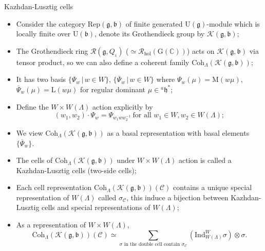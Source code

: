 \documentclass[fleqn,xcolor=dvipsnames]{beamer}
\newcommand{\BC}{{\mathbb {C}}}
\newcommand{\CC}{{\mathcal {C}}}
\newcommand{\CK}{{\mathcal {K}}}
\newcommand{\CR}{{\mathcal {R}}}
\newcommand{\RG}{{\mathrm {G}}}
\newcommand{\RL}{{\mathrm {L}}}
\newcommand{\RM}{{\mathrm {M}}}
\newcommand{\fb}{\mathfrak{b}}
\newcommand{\fg}{\mathfrak{g}}
\newcommand{\fh}{\mathfrak{h}}
\newcommand{\U}{{\mathrm{U}}}
\newcommand{\Ind}{{\mathrm{Ind}}}
\newcommand{\Rep}{{\mathrm{Rep}}}
\newcommand{\set}[2]{\{#1\,|\,#2\}}
\renewcommand{\bar}{\overline}
\begin{document}
\begin{frame}{Kazhdan-Lusztig cells}
  \begin{itemize}
    \item Consider the category $\Rep(\fg,\fb)$ of finite generated $\U(\fg)$-module which is locally finite over $\U(\fb)$, denote its Grothendieck group by $\CK(\fg,\fb)$;
    \item The Grothendieck ring $\CR(\fg,Q_{\iota})$ ($\simeq \CR_{\mathrm{hol}}(\RG(\BC))$) acts on $\CK(\fg,\fb)$ via tensor product, so we can also define a coherent family $\mathrm{Coh}_{\Lambda}(\CK(\fg,\fb))$;
    \item It has two basis $\set{\Psi_w}{w \in W}$, $\set{\bar{\Psi}_{w}}{w \in W}$ where $\Psi_w(\mu) = \RM(w\mu)$, $\bar{\Psi}_{w}(\mu) = \RL(w\mu)$ for regular dominant $\mu \in {^{a}\fh}^*$;
    \item Define the $W \times W(\Lambda)$ action explicitly by \[(w_1,w_2) \cdot \Psi_w = \Psi_{w_1 w w_2^{-1}} \ \textrm{for all $w_1 \in W, w_2 \in W(\Lambda)$};\]
    \item We view $\mathrm{Coh}_{\Lambda}(\CK(\fg,\fb))$ as a basal representation with basal elements $\{\bar{\Psi}_w\}$.
    
  \end{itemize}
  
\end{frame}



\begin{frame}
\begin{itemize}
  \item The cells of $\mathrm{Coh}_{\Lambda}(\CK(\fg,\fb))$ under $W \times W(\Lambda)$ action is called a \alert{Kazhdan-Lusztig cells} (two-side cells);
  \item Each cell representation $\mathrm{Coh}_{\Lambda}(\CK(\fg,\fb))(\CC)$ contains a unique special representation of $W(\Lambda)$ called $\sigma_{\CC}$, this induce a bijection between Kazhdan-Lusztig cells and special representations of $W(\Lambda)$;
  \item As a representation of $W \times W(\Lambda)$, \[\mathrm{Coh}_{\Lambda}(\CK(\fg,\fb))(\CC) \simeq \sum\limits_{\textrm{$\sigma$ in the double cell contain $\sigma_{\CC}$}}(\Ind_{W(\Lambda)}^{W}\sigma) \otimes \sigma.\]
\end{itemize}


  
  
\end{frame}
\end{document}
